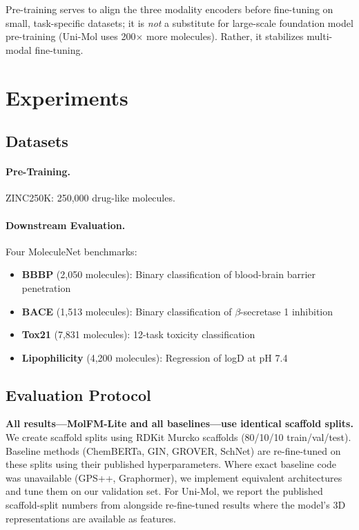 \documentclass[11pt]{article}
\newcommand{\modelname}{MolFM-Lite}
\begin{document}
Pre-training serves to align the three modality encoders before fine-tuning on small, task-specific datasets; it is \emph{not} a substitute for large-scale foundation model pre-training (Uni-Mol uses 200$\times$ more molecules). Rather, it stabilizes multi-modal fine-tuning.

\section{Experiments}
\label{sec:experiments}

\subsection{Datasets}

\paragraph{Pre-Training.}
ZINC250K: 250,000 drug-like molecules.

\paragraph{Downstream Evaluation.}
Four MoleculeNet \citep{wu2018moleculenet} benchmarks:
\begin{itemize}[leftmargin=*,itemsep=2pt]
    \item \textbf{BBBP} (2,050 molecules): Binary classification of blood-brain barrier penetration
    \item \textbf{BACE} (1,513 molecules): Binary classification of $\beta$-secretase 1 inhibition
    \item \textbf{Tox21} (7,831 molecules): 12-task toxicity classification
    \item \textbf{Lipophilicity} (4,200 molecules): Regression of logD at pH 7.4
\end{itemize}

\subsection{Evaluation Protocol}
\label{sec:eval_protocol}

\textbf{All results---\modelname{} and all baselines---use identical scaffold splits.} We create scaffold splits using RDKit Murcko scaffolds (80/10/10 train/val/test). Baseline methods (ChemBERTa, GIN, GROVER, SchNet) are re-fine-tuned on these splits using their published hyperparameters. Where exact baseline code was unavailable (GPS++, Graphormer), we implement equivalent architectures and tune them on our validation set. For Uni-Mol, we report the published scaffold-split numbers from \citet{zhou2023unimol} alongside re-fine-tuned results where the model's 3D representations are available as features.
\end{document}
